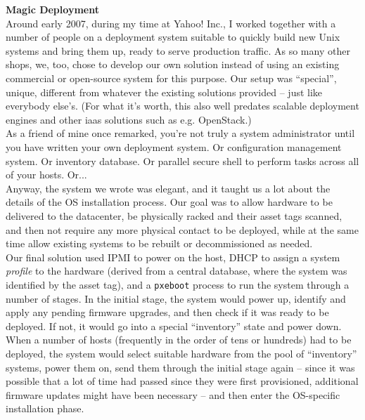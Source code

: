 \begin{experience}
{\bf Magic Deployment} \\

Around early 2007, during my time at Yahoo! Inc., I
worked together with a number of people on a
deployment system suitable to quickly build new Unix
systems and bring them up, ready to serve production
traffic.  As so many other shops, we, too, chose to
develop our own solution instead of using an existing
commercial or open-source system for this purpose.
Our setup was ``special'', unique, different from
whatever the existing solutions provided -- just like
everybody else's. (For what it's worth, this also
well predates scalable deployment engines and other
\gls{iaas}
solutions such as e.g. OpenStack.) \\
[10pt]

As a friend of mine once remarked,
you're not truly a system administrator until you have
written your own deployment system. Or configuration
management system.  Or inventory database.  Or
parallel secure shell to perform tasks across all of
your hosts.  Or... \\ [10pt]

Anyway, the system we wrote was elegant, and it taught
us a lot about the details of the OS installation
process.  Our goal was to allow hardware to be
delivered to the datacenter, be physically racked and
their asset tags scanned, and then not require any
more physical contact to be deployed, while at the
same time allow existing systems to be rebuilt or
decommissioned as needed. \\ [10pt]

Our final solution used IPMI to power on
the host, DHCP to assign a system {\em
profile} to the hardware (derived from a central
database, where the system was identified by the asset
tag), and a {\tt pxeboot} process to
run the system through a number of stages.  In the
initial stage, the system would power up, identify and
apply any pending firmware upgrades, and then check if
it was ready to be deployed.  If not, it would go into
a special ``inventory'' state and power down. \\
[10pt]

When a number of hosts (frequently in the order of
tens or hundreds) had to be deployed, the system would
select suitable hardware from the pool of
``inventory'' systems, power them on, send them
through the initial stage again -- since it was
possible that a lot of time had passed since they were
first provisioned, additional firmware updates might
have been necessary -- and then enter the OS-specific
installation phase. \\ [10pt]


\end{experience}
